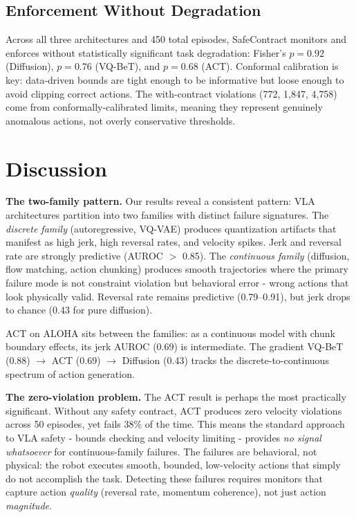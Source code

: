 \documentclass[conference]{IEEEtran}
\begin{document}
\subsection{Enforcement Without Degradation}

Across all three architectures and 450 total episodes, SafeContract monitors and enforces without statistically significant task degradation: Fisher's $p{=}0.92$ (Diffusion), $p{=}0.76$ (VQ-BeT), and $p{=}0.68$ (ACT).
Conformal calibration is key: data-driven bounds are tight enough to be informative but loose enough to avoid clipping correct actions.
The with-contract violations (772, 1{,}847, 4{,}758) come from conformally-calibrated limits, meaning they represent genuinely anomalous actions, not overly conservative thresholds.

\section{Discussion}

\textbf{The two-family pattern.}
Our results reveal a consistent pattern: VLA architectures partition into two families with distinct failure signatures.
The \emph{discrete family} (autoregressive, VQ-VAE) produces quantization artifacts that manifest as high jerk, high reversal rates, and velocity spikes.
Jerk and reversal rate are strongly predictive (AUROC $>$ 0.85).
The \emph{continuous family} (diffusion, flow matching, action chunking) produces smooth trajectories where the primary failure mode is not constraint violation but behavioral error - wrong actions that look physically valid.
Reversal rate remains predictive (0.79--0.91), but jerk drops to chance (0.43 for pure diffusion).

ACT on ALOHA sits between the families: as a continuous model with chunk boundary effects, its jerk AUROC (0.69) is intermediate.
The gradient VQ-BeT (0.88) $\rightarrow$ ACT (0.69) $\rightarrow$ Diffusion (0.43) tracks the discrete-to-continuous spectrum of action generation.

\textbf{The zero-violation problem.}
The ACT result is perhaps the most practically significant.
Without any safety contract, ACT produces zero velocity violations across 50 episodes, yet fails 38\% of the time.
This means the standard approach to VLA safety - bounds checking and velocity limiting - provides \emph{no signal whatsoever} for continuous-family failures.
The failures are behavioral, not physical: the robot executes smooth, bounded, low-velocity actions that simply do not accomplish the task.
Detecting these failures requires monitors that capture action \emph{quality} (reversal rate, momentum coherence), not just action \emph{magnitude}.
\end{document}
